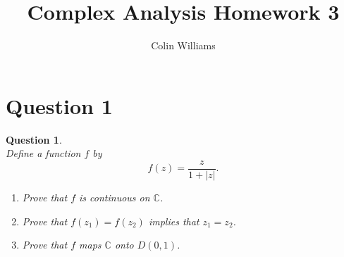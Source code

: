 \documentclass[10pt,a4paper]{article}
\title{Complex Analysis Homework 3}
\author{Colin Williams}
\newtheorem*{question*}{Question}
\begin{document}
\maketitle
\section*{Question 1}
\begin{question*}{$ $}
\\Define a function $f$ by 
\[f(z) = \frac{z}{1 + |z|}.\]
\begin{enumerate}[label = (\alph*)]
\item Prove that $f$ is continuous on $\mathbb{C}$.
\item Prove that $f(z_1) = f(z_2)$ implies that $z_1 = z_2$.
\item Prove that $f$ maps $\mathbb{C}$ onto $D(0,1)$.
\end{enumerate}


\end{question*}
\end{document}
